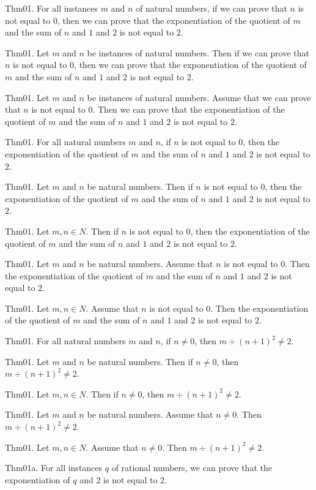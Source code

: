 \documentclass{article}
\begin{document}
Thm01. For all instances $m$ and $n$ of natural numbers, if we can prove that $n$ is not equal to $0$, then we can prove that the exponentiation of the quotient of $m$ and the sum of $n$ and $1$ and $2$ is not equal to $2$.

Thm01. Let $m$ and $n$ be instances of natural numbers. Then if we can prove that $n$ is not equal to $0$, then we can prove that the exponentiation of the quotient of $m$ and the sum of $n$ and $1$ and $2$ is not equal to $2$.

Thm01. Let $m$ and $n$ be instances of natural numbers. Assume that we can prove that $n$ is not equal to $0$. Then we can prove that the exponentiation of the quotient of $m$ and the sum of $n$ and $1$ and $2$ is not equal to $2$.

Thm01. For all natural numbers $m$ and $n$, if $n$ is not equal to $0$, then the exponentiation of the quotient of $m$ and the sum of $n$ and $1$ and $2$ is not equal to $2$.

Thm01. Let $m$ and $n$ be natural numbers. Then if $n$ is not equal to $0$, then the exponentiation of the quotient of $m$ and the sum of $n$ and $1$ and $2$ is not equal to $2$.

Thm01. Let $m , n \in N$. Then if $n$ is not equal to $0$, then the exponentiation of the quotient of $m$ and the sum of $n$ and $1$ and $2$ is not equal to $2$.

Thm01. Let $m$ and $n$ be natural numbers. Assume that $n$ is not equal to $0$. Then the exponentiation of the quotient of $m$ and the sum of $n$ and $1$ and $2$ is not equal to $2$.

Thm01. Let $m , n \in N$. Assume that $n$ is not equal to $0$. Then the exponentiation of the quotient of $m$ and the sum of $n$ and $1$ and $2$ is not equal to $2$.

Thm01. For all natural numbers $m$ and $n$, if $n \neq 0$, then $m \div (n + 1)^{ 2}\neq 2$.

Thm01. Let $m$ and $n$ be natural numbers. Then if $n \neq 0$, then $m \div (n + 1)^{ 2}\neq 2$.

Thm01. Let $m , n \in N$. Then if $n \neq 0$, then $m \div (n + 1)^{ 2}\neq 2$.

Thm01. Let $m$ and $n$ be natural numbers. Assume that $n \neq 0$. Then $m \div (n + 1)^{ 2}\neq 2$.

Thm01. Let $m , n \in N$. Assume that $n \neq 0$. Then $m \div (n + 1)^{ 2}\neq 2$.

Thm01a. For all instances $q$ of rational numbers, we can prove that the exponentiation of $q$ and $2$ is not equal to $2$.
\end{document}
